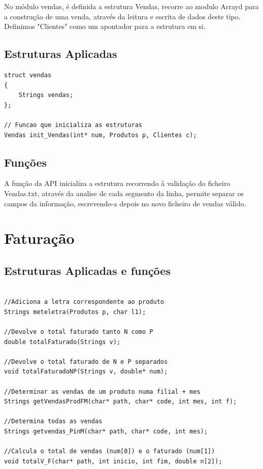 \documentclass[a4paper]{report} %
\begin{document}
\par No módulo vendas, é definida a estrutura Vendas, recorre ao modulo Arrayd para a construção de uma venda, através da leitura e escrita de dados deste tipo. Definimos "Clientes" como um apontador para a estrutura em si.


\subsection{Estruturas Aplicadas}
\begin{lstlisting}[style=CStyle]
struct vendas
{
	Strings vendas;
};

// Funcao que inicializa as estruturas
Vendas init_Vendas(int* num, Produtos p, Clientes c);
\end{lstlisting}
\par
\subsection{Funções}
\par A função da API inicializa a estrutura recorrendo à validação do ficheiro Vendas.txt, através da analise de  cada segmento da linha, permite separar os campos da informação, escrevendo-a depois no novo ficheiro de vendas válido.


\section{Faturação}

\subsection{Estruturas Aplicadas e funções}
\begin{lstlisting}[style=CStyle]

//Adiciona a letra correspondente ao produto
Strings meteletra(Produtos p, char l1);

//Devolve o total faturado tanto N como P
double totalFaturado(Strings v);

//Devolve o total faturado de N e P separados
void totalFaturadoNP(Strings v, double* num);

//Determinar as vendas de um produto numa filial + mes
Strings getVendasProdFM(char* path, char* code, int mes, int f);

//Determina todas as vendas
Strings getvendas_PinM(char* path, char* code, int mes);

//Calcula o total de vendas (num[0]) e o faturado (num[1])
void totalV_F(char* path, int inicio, int fim, double n[2]);

\end{lstlisting}
\end{document}
